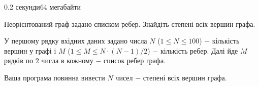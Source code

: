 \begin{problem}{}{}{}{0.2 секунди}{64 мегабайти}

Неорієнтований граф задано списком ребер. Знайдіть степені всіх вершин графа.

\InputFile
У першому рядку вхідних даних задано числа $N$ ($1 \le N \le 100$) $-$ кількість вершин у графі 
і $M$ ($1 \le M \le N\cdot (N-1) / 2$) $-$ кількість ребер. 
Далі йде $M$ рядків по $2$ числа в кожному $-$ список ребер графа. 

\OutputFile
Ваша програма повинна вивести $N$ чисел $-$ степені всіх вершин графа.

\Example

\begin{example}
%
\end{example}

\end{problem}


